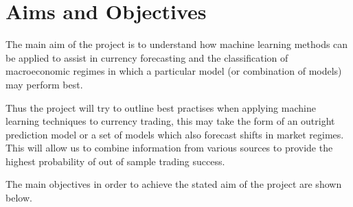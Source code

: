 \documentclass[12pt, a4paper]{article}
\begin{document}
\section{Aims and Objectives}
The main aim of the project is to understand how machine learning methods can be applied to assist in currency forecasting and the classification of macroeconomic regimes in which a particular model (or combination of models) may perform best.
\par Thus the project will try to outline best practises when applying machine learning techniques to currency trading, this may take the form of an outright prediction model or a set of models which also forecast shifts in market regimes. This will allow us to combine information from various sources to provide the highest probability of out of sample trading success.

The main objectives in order to achieve the stated aim of the project are shown below.
\end{document}
